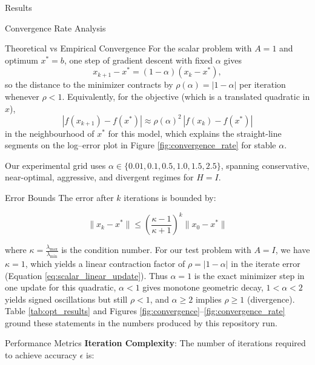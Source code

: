 \documentclass[
  ignorenonframetext,
]{beamer}
\begin{document}
\begin{frame}[fragile]{Results}
\begin{block}{Convergence Rate Analysis}
\begin{block}{Theoretical vs Empirical Convergence}
For the scalar problem with \(A = 1\) and optimum \(x^\ast = b\), one
step of gradient descent with fixed \(\alpha\) gives \begin{equation}
\label{eq:scalar_linear_update}
x_{k+1} - x^\ast = (1 - \alpha)(x_k - x^\ast),
\end{equation} so the distance to the minimizer contracts by
\(\rho(\alpha) = |1 - \alpha|\) per iteration whenever \(\rho < 1\).
Equivalently, for the objective (which is a translated quadratic in
\(x\)), \begin{equation}
\label{eq:convergence_bound}
|f(x_{k+1}) - f(x^\ast)| \approx \rho(\alpha)^2 \, |f(x_k) - f(x^\ast)|
\end{equation} in the neighbourhood of \(x^\ast\) for this model, which
explains the straight-line segments on the log--error plot in Figure
\ref{fig:convergence_rate} for stable \(\alpha\).

Our experimental grid uses
\(\alpha \in \{0.01, 0.1, 0.5, 1.0, 1.5, 2.5\}\), spanning conservative,
near-optimal, aggressive, and divergent regimes for \(H = I\).
\end{block}

\begin{block}{Error Bounds}
\protect{}\label{error-bounds}
The error after \(k\) iterations is bounded by:

\begin{equation}
\label{eq:error_bound}
\|x_k - x^*\| \leq \left(\frac{\kappa - 1}{\kappa + 1}\right)^k \|x_0 - x^*\|
\end{equation}

where \(\kappa = \frac{\lambda_{\max}}{\lambda_{\min}}\) is the
condition number. For our test problem with \(A = I\), we have
\(\kappa = 1\), which yields a linear contraction factor of
\(\rho = |1 - \alpha|\) in the iterate error (Equation
\ref{eq:scalar_linear_update}). Thus \(\alpha = 1\) is the exact
minimizer step in one update for this quadratic, \(\alpha < 1\) gives
monotone geometric decay, \(1 < \alpha < 2\) yields signed oscillations
but still \(\rho < 1\), and \(\alpha \geq 2\) implies \(\rho \geq 1\)
(divergence). Table \ref{tab:opt_results} and Figures
\ref{fig:convergence}--\ref{fig:convergence_rate} ground these
statements in the numbers produced by this repository run.
\end{block}

\begin{block}{Performance Metrics}
\protect{}\label{performance-metrics}
\textbf{Iteration Complexity}: The number of iterations required to
achieve accuracy \(\epsilon\) is:


\end{block}
\end{block}
\end{frame}
\end{document}

